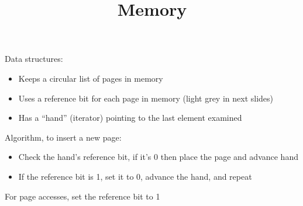 

\title{Memory}

	


\begin{frame}
    \titlepage
\end{frame}
 
 \begin{slide}


    Data structures:
    \begin{itemize}
      \item Keeps a circular list of pages in memory
      \item Uses a reference bit for each page in memory (light grey in next slides)
      \item Has a ``hand'' (iterator) pointing to the last element examined
    \end{itemize}
    \medskip

    Algorithm, to insert a new page:
    \begin{itemize}
      \item Check the hand's reference bit, if it's 0 then place the page and advance hand
      \item If the reference bit is 1, set it to 0, advance the hand, and repeat
    \end{itemize}
    \medskip

    For page accesses, set the reference bit to 1

\end{slide}

